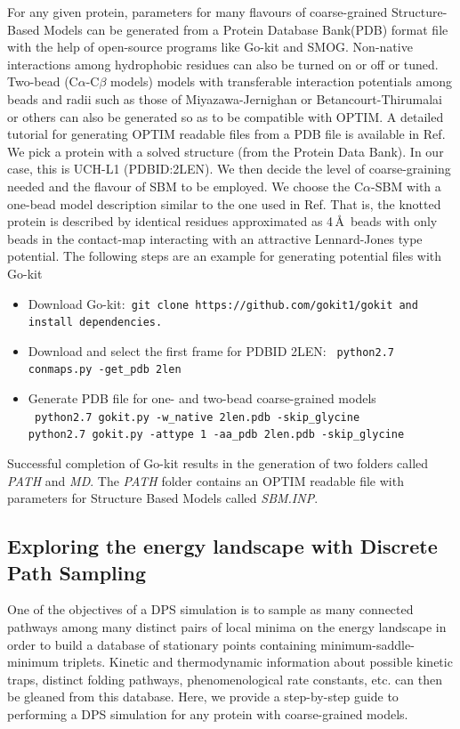 \documentclass[journal=jacsat]{achemso}
\begin{document}
For any given protein, parameters for many flavours of coarse-grained Structure-Based Models can be generated from a Protein Database Bank(PDB)\cite{PDB} format file with the help of open-source programs like Go-kit\cite{Neelamraju19a} and SMOG\cite{smog}. Non-native interactions among hydrophobic residues can also be turned on or off or tuned. Two-bead (C$\alpha$-C$\beta$ models) models with transferable interaction potentials among beads and radii such as those of Miyazawa-Jernighan\cite{Miyazawa99a,Miyazawa85a,Zeng12a} or Betancourt-Thirumalai\cite{Betancourt95a,Betancourt99a} or others \cite{Honeycutt90a,Cieplak09a,Lammert09,Dill89a} can also be generated so as to be compatible with OPTIM\cite{OPTIM}. A detailed tutorial for generating OPTIM readable files from a PDB file is available in Ref\cite{Neelamraju18a}. We pick a protein with a solved structure (from the Protein Data Bank\cite{PDB}). In our case, this is UCH-L1 (PDBID:2LEN)\cite{Tse11a}. We then decide the level of coarse-graining needed and the flavour of SBM to be employed. We choose the C$\alpha$-SBM with a one-bead model description similar to the one used in Ref\cite{Zhao18a}. That is, the knotted protein is described by identical residues approximated as 4\,\AA\ beads with only beads in the contact-map interacting with an attractive Lennard-Jones type potential\cite{smog,Zhao18a}. The following steps are an example for generating potential files with Go-kit\cite{Neelamraju19a} 

\begin{itemize}
\small
    \item {Download Go-kit\cite{Neelamraju19a}:\tt { git clone https://github.com/gokit1/gokit} and install dependencies.}
    \item{ Download and select the first frame for PDBID 2LEN: \tt{ python2.7 conmaps.py -get\_pdb 2len}}
    \item{ Generate PDB file for one- and two-bead coarse-grained models\\ \tt{ python2.7 gokit.py -w\_native 2len.pdb -skip\_glycine \\  python2.7 gokit.py -attype 1 -aa\_pdb 2len.pdb -skip\_glycine}}
\end{itemize}

Successful completion of Go-kit results in the generation of two folders called \emph{PATH} and \emph{MD}. The \emph{PATH} folder contains an OPTIM readable file with parameters for Structure Based Models called \emph{SBM.INP}. 

\subsection{Exploring the energy landscape with Discrete Path Sampling}
One of the objectives of a DPS simulation is to sample as many connected pathways among many distinct pairs of local minima on the energy landscape in order to build a database of stationary points containing minimum-saddle-minimum triplets. Kinetic and thermodynamic information about possible kinetic traps, distinct folding pathways, phenomenological rate constants, etc. can then be gleaned from this database. Here, we provide a step-by-step guide to performing a DPS simulation for any protein with coarse-grained models.
\end{document}
